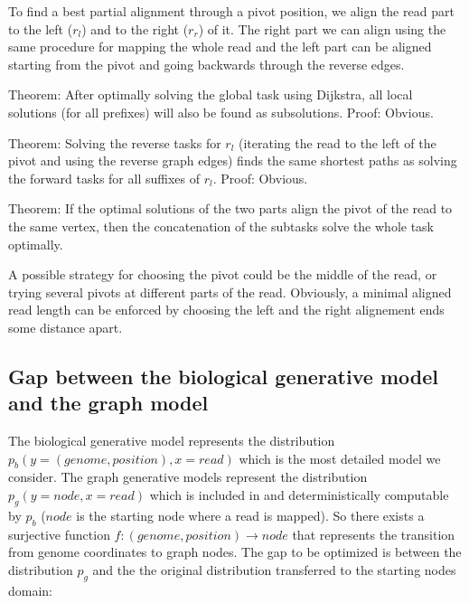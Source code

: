 To find a best partial alignment through a pivot position, we align the read part to the left ($r_l$) and to the right ($r_r$) of it.
The right part we can align using the same procedure for mapping the whole read
	and the left part can be aligned starting from the pivot and going backwards through the reverse edges.

Theorem: After optimally solving the global task using Dijkstra, all local solutions (for all prefixes) will also be found as subsolutions.
Proof: Obvious. 

Theorem: Solving the reverse tasks for $r_l$ (iterating the read to the left of the pivot and using the reverse graph edges)
	finds the same shortest paths as solving the forward tasks for all suffixes of $r_l$.
Proof: Obvious. 

Theorem: If the optimal solutions of the two parts align the pivot of the read to the same vertex, then the concatenation of the subtasks solve the whole task optimally.

A possible strategy for choosing the pivot could be the middle of the read, or trying several pivots at different parts of the read.
Obviously, a minimal aligned read length can be enforced by choosing the left and the right alignement ends some distance apart.
%

\subsection{Gap between the biological generative model and the graph model}
The biological generative model represents the distribution $p_b(y=(genome, position), x=read)$ which is the most detailed model we consider. The graph generative models represent the distribution $p_g(y=node, x=read)$ which is included in and deterministically computable by $p_b$ ($node$ is the starting node where a read is mapped). So there exists a surjective function $f: (genome, position) \to node$ that represents the transition from genome coordinates to graph nodes. The gap to be optimized is between the distribution $p_g$ and the the original distribution transferred to the starting nodes domain:

